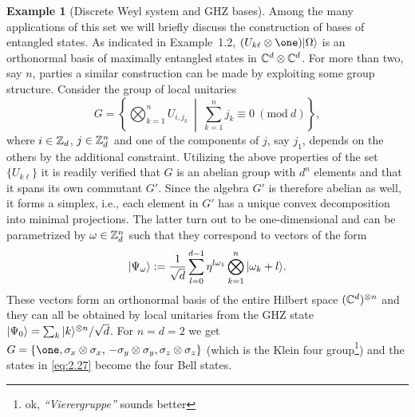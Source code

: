 \documentclass[11pt,a4paper]{article}
\numberwithin{equation}{section}
\theoremstyle{plain}
\theoremstyle{definition}
\newtheorem{example}{Example}[section]
\begin{document}
\begin{example}[Discrete Weyl system and GHZ bases]
    Among the many applications of this set we will briefly discuss the construction of
    bases of entangled states. As indicated in Example~1.2, $(U_{k\ell}\otimes \one)\ket{\Omega}$
    is an orthonormal basis of maximally entangled states in $\mathbb{C}^d \otimes \mathbb{C}^d$. For
    more than two, say $n$, parties a similar construction can be made by exploiting
    some group structure. Consider the group of local unitaries
    \begin{equation}\label{eq:2.26}
        G =
        \left\{\bigotimes_{k=1}^n U_{i,j_k}
        \ \middle|\
        \sum_{k=1}^n j_k \equiv 0 \ (\mathrm{mod}\ d)\right\},
    \end{equation}
    where $i\in \mathbb{Z}_d$, $j\in \mathbb{Z}_d^n$ and one of the components of $j$, say $j_1$,
    depends on the others by the additional constraint. Utilizing the above properties
    of the set $\{U_{k\ell}\}$ it is readily verified that $G$ is an abelian group with
    $d^n$ elements and that it spans its own commutant $G'$. Since the algebra $G'$ is
    therefore abelian as well, it forms a simplex, i.e., each element in $G'$ has a
    unique convex decomposition into minimal projections. The latter turn out to be
    one-dimensional and can be parametrized by $\omega\in \mathbb{Z}_d^n$ such that they
    correspond to vectors of the form
    \begin{equation}\label{eq:2.27}
        |\Psi_\omega\rangle :=
        \frac{1}{\sqrt{d}}\sum_{l=0}^{d-1} \eta^{l\omega_1}\bigotimes_{k=1}^n |\omega_k + l\rangle.
    \end{equation}
    These vectors form an orthonormal basis of the entire Hilbert space
    $(\mathbb{C}^d)^{\otimes n}$ and they can all be obtained by local unitaries from the GHZ
    state $|\Psi_0\rangle=\sum_k |k\rangle^{\otimes n}/\sqrt{d}$. For $n=d=2$ we get
    $G=\{\one, \sigma_x\otimes \sigma_x,\,-\sigma_y\otimes \sigma_y, \sigma_z\otimes \sigma_z\}$
    (which is the Klein four group\footnote{ok, \emph{``Vierergruppe''} sounds better})
    and the states in \eqref{eq:2.27} become the four Bell states.
\end{example}
\end{document}

